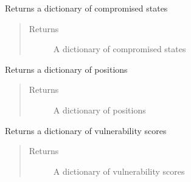 \documentclass[letterpaper,10pt,english]{sphinxmanual}
\begin{document}
\begin{fulllineitems}
\begin{fulllineitems}
\label{\detokenize{source/yawning_titan.envs.generic.core:yawning_titan.envs.generic.core.network_interface.NetworkInterface.get_all_node_compromised_states}}
\sphinxAtStartPar
Returns a dictionary of compromised states
\begin{quote}\begin{description}
\item[{Returns}] \leavevmode
\sphinxAtStartPar
A dictionary of compromised states

\end{description}\end{quote}

\end{fulllineitems}


\begin{fulllineitems}
\label{\detokenize{source/yawning_titan.envs.generic.core:yawning_titan.envs.generic.core.network_interface.NetworkInterface.get_all_node_positions}}
\sphinxAtStartPar
Returns a dictionary of positions
\begin{quote}\begin{description}
\item[{Returns}] \leavevmode
\sphinxAtStartPar
A dictionary of positions

\end{description}\end{quote}

\end{fulllineitems}


\begin{fulllineitems}
\label{\detokenize{source/yawning_titan.envs.generic.core:yawning_titan.envs.generic.core.network_interface.NetworkInterface.get_all_vulnerabilities}}
\sphinxAtStartPar
Returns a dictionary of vulnerability scores
\begin{quote}\begin{description}
\item[{Returns}] \leavevmode
\sphinxAtStartPar
A dictionary of vulnerability scores


\end{description}
\end{quote}
\end{fulllineitems}
\end{fulllineitems}
\end{document}
